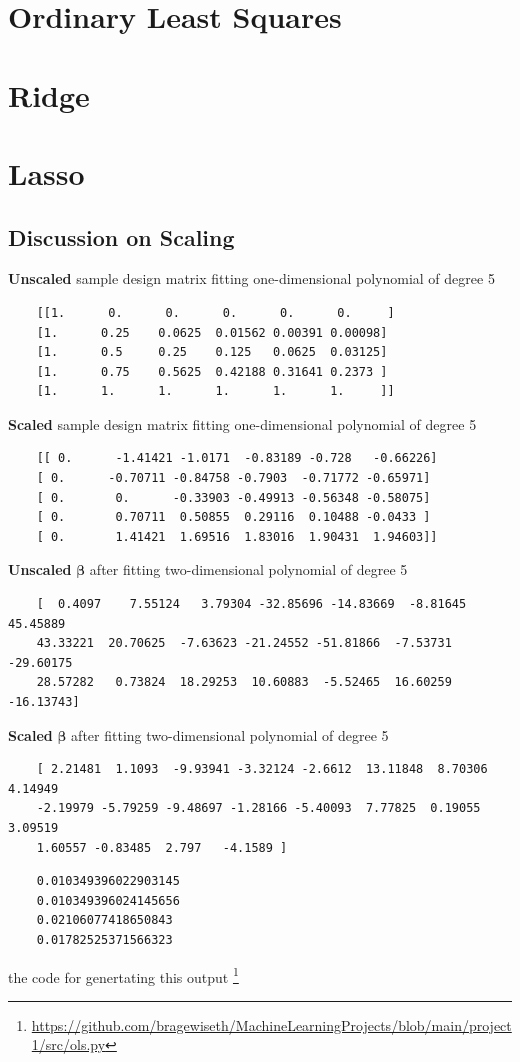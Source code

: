 \documentclass[twoside,11pt]{report}
\begin{document}
\pagebreak

\section{Ordinary Least Squares}
\section{Ridge}
\section{Lasso}
\subsection{Discussion on Scaling}


\textbf{Unscaled} sample design matrix fitting one-dimensional polynomial of degree 5
\begin{verbatim}
    [[1.      0.      0.      0.      0.      0.     ]
    [1.      0.25    0.0625  0.01562 0.00391 0.00098]
    [1.      0.5     0.25    0.125   0.0625  0.03125]
    [1.      0.75    0.5625  0.42188 0.31641 0.2373 ]
    [1.      1.      1.      1.      1.      1.     ]]

\end{verbatim}
\textbf{Scaled} sample design matrix fitting one-dimensional polynomial of degree 5
\begin{verbatim}  
    [[ 0.      -1.41421 -1.0171  -0.83189 -0.728   -0.66226]
    [ 0.      -0.70711 -0.84758 -0.7903  -0.71772 -0.65971]
    [ 0.       0.      -0.33903 -0.49913 -0.56348 -0.58075]
    [ 0.       0.70711  0.50855  0.29116  0.10488 -0.0433 ]
    [ 0.       1.41421  1.69516  1.83016  1.90431  1.94603]]
\end{verbatim}
\textbf{Unscaled} $\boldsymbol{\beta}$ after fitting two-dimensional polynomial of degree 5
\begin{verbatim}
    [  0.4097    7.55124   3.79304 -32.85696 -14.83669  -8.81645  45.45889
    43.33221  20.70625  -7.63623 -21.24552 -51.81866  -7.53731 -29.60175
    28.57282   0.73824  18.29253  10.60883  -5.52465  16.60259 -16.13743]
\end{verbatim}
\textbf{Scaled} $\boldsymbol{\beta}$ after fitting two-dimensional polynomial of degree 5
\begin{verbatim}
    [ 2.21481  1.1093  -9.93941 -3.32124 -2.6612  13.11848  8.70306  4.14949
    -2.19979 -5.79259 -9.48697 -1.28166 -5.40093  7.77825  0.19055  3.09519
    1.60557 -0.83485  2.797   -4.1589 ]
\end{verbatim}
\begin{verbatim}
    0.010349396022903145
    0.010349396024145656
    0.02106077418650843
    0.01782525371566323
\end{verbatim}
\begin{center}
    \scriptsize
    the code for genertating this output \footnote{\url{https://github.com/bragewiseth/MachineLearningProjects/blob/main/project1/src/ols.py}\cite{MachineLearningProjects_2023}}
\end{center}
\end{document}
